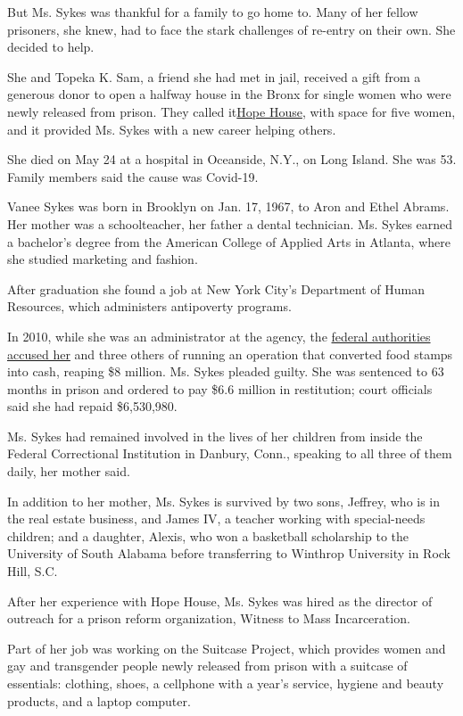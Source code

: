 But Ms. Sykes was thankful for a family to go home to. Many of her
fellow prisoners, she knew, had to face the stark challenges of re-entry
on their own. She decided to help.

She and Topeka K. Sam, a friend she had met in jail, received a gift
from a generous donor to open a halfway house in the Bronx for single
women who were newly released from prison. They called
it\href{https://www.nytimes3xbfgragh.onion/2017/12/27/nyregion/a-house-for-women-leaving-prison-sits-empty.html}{Hope
House}, with space for five women, and it provided Ms. Sykes with a new
career helping others.

She died on May 24 at a hospital in Oceanside, N.Y., on Long Island. She
was 53. Family members said the cause was Covid-19.

Vanee Sykes was born in Brooklyn on Jan. 17, 1967, to Aron and Ethel
Abrams. Her mother was a schoolteacher, her father a dental technician.
Ms. Sykes earned a bachelor's degree from the American College of
Applied Arts in Atlanta, where she studied marketing and fashion.

After graduation she found a job at New York City's Department of Human
Resources, which administers antipoverty programs.

In 2010, while she was an administrator at the agency, the
\href{https://www.nytimes3xbfgragh.onion/2010/12/09/nyregion/09hra.html}{federal
authorities accused her} and three others of running an operation that
converted food stamps into cash, reaping \$8 million. Ms. Sykes pleaded
guilty. She was sentenced to 63 months in prison and ordered to pay
\$6.6 million in restitution; court officials said she had repaid
\$6,530,980.

Ms. Sykes had remained involved in the lives of her children from inside
the Federal Correctional Institution in Danbury, Conn., speaking to all
three of them daily, her mother said.

In addition to her mother, Ms. Sykes is survived by two sons, Jeffrey,
who is in the real estate business, and James IV, a teacher working with
special-needs children; and a daughter, Alexis, who won a basketball
scholarship to the University of South Alabama before transferring to
Winthrop University in Rock Hill, S.C.

After her experience with Hope House, Ms. Sykes was hired as the
director of outreach for a prison reform organization, Witness to Mass
Incarceration.

Part of her job was working on the Suitcase Project, which provides
women and gay and transgender people newly released from prison with a
suitcase of essentials: clothing, shoes, a cellphone with a year's
service, hygiene and beauty products, and a laptop computer.

